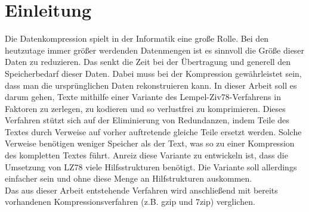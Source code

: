 \documentclass[a4paper,11pt]{scrartcl}%
\theoremstyle{change}
\theoremstyle{nonumberplain}
\theoremstyle{change}
\theoremstyle{nonumberplain}
\theoremstyle{change}
\theoremstyle{nonumberplain}
\begin{document}

\thispagestyle{empty}
\newpage
\tableofcontents
\newpage
\newpage

\section{Einleitung}
Die Datenkompression spielt in der Informatik eine große Rolle. Bei den heutzutage immer größer werdenden Datenmengen ist es sinnvoll die Größe dieser Daten zu reduzieren. Das senkt die Zeit bei der Übertragung und generell den Speicherbedarf dieser Daten. Dabei muss bei der Kompression gewährleistet sein, dass man die ursprünglichen Daten rekonstruieren kann.
In dieser Arbeit soll es darum gehen, Texte mithilfe einer Variante des Lempel-Ziv78-Verfahrens in Faktoren zu zerlegen, zu kodieren und so verlustfrei zu komprimieren. Dieses Verfahren stützt sich auf der Eliminierung von Redundanzen, indem Teile des Textes durch Verweise auf vorher auftretende gleiche Teile ersetzt werden. Solche Verweise benötigen weniger Speicher als der Text, was so zu einer Kompression des kompletten Textes führt.
Anreiz diese Variante zu entwickeln ist, dass die Umsetzung von LZ78 viele Hilfsstrukturen benötigt. Die Variante soll allerdings einfacher sein und ohne diese Menge an Hilfstrukturen auskommen. \\
Das aus dieser Arbeit entstehende Verfahren wird anschließend mit bereits vorhandenen Kompressionsverfahren (z.B. gzip und 7zip) verglichen.\\\\
\end{document}
